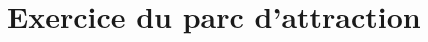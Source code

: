 \documentclass[•]{article}
\begin{document}

\section{Exercice du parc d'attraction}





\end{document}
